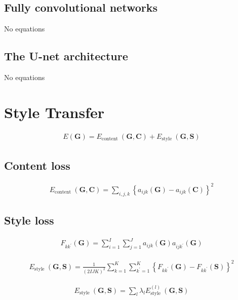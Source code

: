 \documentclass{article}
\begin{document}
\subsection{Fully convolutional networks}
No equations

\subsection{The U-net architecture}
No equations

\section{Style Transfer}

\begin{align*}
E(\mathbf{G}) = E_{\text{content }}(\mathbf{G}, \mathbf{C}) + E_{\text{style }}(\mathbf{G}, \mathbf{S})
\tag{10.13}
\end{align*}

\subsection{Content loss}
\begin{align*}
E_{\text{content }}(\mathbf{G}, \mathbf{C}) = \sum_{i, j, k} \left\{ a_{i j k}(\mathbf{G}) - a_{i j k}(\mathbf{C}) \right\}^{2}
\tag{10.14}
\end{align*}

\subsection{Style loss}
\begin{align*}
F_{k k^{\prime}}(\mathbf{G}) = \sum_{i=1}^{I} \sum_{j=1}^{J} a_{i j k}(\mathbf{G}) a_{i j k^{\prime}}(\mathbf{G}) 
\tag{10.15}
\end{align*}

\begin{align*}
E_{\text{style }}(\mathbf{G}, \mathbf{S}) = \frac{1}{(2 I J K)^{2}} \sum_{k=1}^{K} \sum_{k^{\prime}=1}^{K} \left\{ F_{k k^{\prime}}(\mathbf{G}) - F_{k k^{\prime}}(\mathbf{S}) \right\}^{2}
\tag{10.16}
\end{align*}

\begin{align*}
E_{\text{style }}(\mathbf{G}, \mathbf{S}) = \sum_{l} \lambda_{l} E_{\text{style }}^{(l)}(\mathbf{G}, \mathbf{S}) 
\tag{10.17}
\end{align*}
\end{document}
